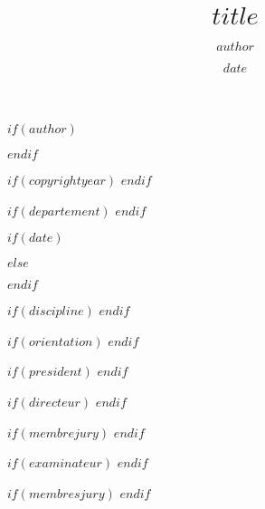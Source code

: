 \documentclass[11pt,twoside,maitrise]{littfra}
\numberwithin{equation}{section}
\numberwithin{table}{chapter}
\numberwithin{figure}{chapter}
\begin{document}



\title{$title$}

$if(author)$
\author{$author$}
$endif$

$if(copyrightyear)$
$endif$

$if(departement)$
$endif$

$if(date)$
\date{$date$} %
$else$
\date{\todayfr} %
$endif$

$if(discipline)$
$endif$

$if(orientation)$
$endif$

$if(president)$
$endif$

$if(directeur)$
$endif$


$if(membrejury)$
$endif$

$if(examinateur)$
$endif$

$if(membresjury)$
$endif$
\end{document}
